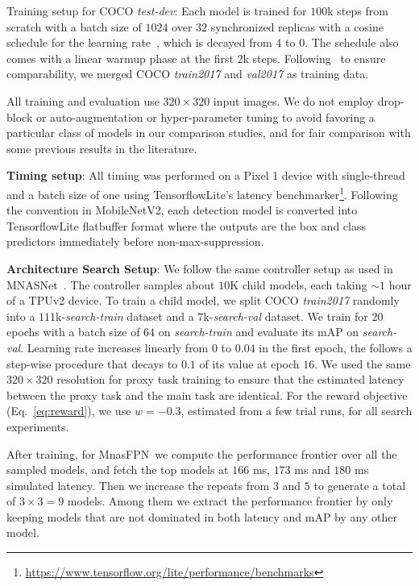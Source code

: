 \documentclass[10pt,twocolumn,letterpaper]{article}
\def\Mnasfpn{MnasFPN~}
\begin{document}
Training setup for COCO {\it test-dev}: Each model is trained for $100$k steps from scratch with a batch size of $1024$ over $32$ synchronized replicas with a cosine schedule for the learning rate~\cite{loshchilov2016sgdr}, which is decayed from $4$ to $0$. The schedule also comes with a linear warmup phase at the first $2$k steps. Following~\cite{sandler2018mobilenetv2, huang2017speed} to ensure comparability, we merged COCO {\it train2017} and {\it val2017} as training data.

All training and evaluation use $320\times 320$ input images. We do not employ drop-block or auto-augmentation or hyper-parameter tuning to avoid favoring a particular class of models in our comparison studies, and for fair comparison with some previous results in the literature.

{\bf Timing setup}:
All timing was performed on a Pixel 1 device with single-thread and a batch size of one using TensorflowLite's latency benchmarker\footnote{\url{https://www.tensorflow.org/lite/performance/benchmarks}}. Following the convention in MobileNetV2\cite{sandler2018mobilenetv2}, each detection model is converted into TensorflowLite flatbuffer format where the outputs are the box and class predictors immediately before non-max-suppression. 


{\bf Architecture Search Setup}:
We follow the same controller setup as used in MNASNet~\cite{tan2019mnasnet}. The controller samples about $10$K child models, each taking $\sim 1$ hour of a TPUv2 device. To train a child model, we split COCO {\it train2017} randomly into a $111$k-{\it search-train} dataset and a $7$k-{\it search-val} dataset. We train for $20$ epochs with a batch size of $64$ on {\it search-train} and evaluate its mAP on {\it search-val}. Learning rate increases linearly from $0$ to $0.04$ in the first epoch, the follows a step-wise procedure that decays to $0.1$ of its value at epoch $16$. We used the same $320\times 320$ resolution for proxy task training to ensure that the estimated latency between the proxy task and the main task are identical. For the reward objective (Eq.~\ref{eq:reward}), we use $w=-0.3$, estimated from a few trial runs, for all search experiments.


After training, for \Mnasfpn we compute the performance frontier over all the sampled models, and fetch the top models at $166$ ms, $173$ ms and $180$ ms simulated latency. Then we increase the repeats from $3$ and $5$ to generate a  total of $3\times 3=9$ models. Among them we extract the performance frontier by only keeping models that are not dominated in both latency and mAP by any other model. 
\end{document}
